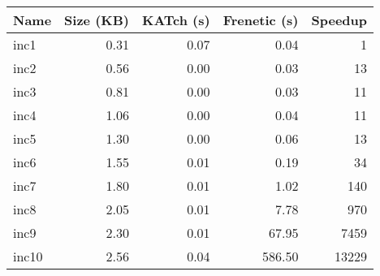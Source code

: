 \begin{tabular}{lrrrr}
\toprule
Name & Size (KB) & KATch (s) & Frenetic (s) & Speedup \\
\midrule
inc1 & 0.31 & 0.07 & 0.04 & 1 \\
inc2 & 0.56 & 0.00 & 0.03 & 13 \\
inc3 & 0.81 & 0.00 & 0.03 & 11 \\
inc4 & 1.06 & 0.00 & 0.04 & 11 \\
inc5 & 1.30 & 0.00 & 0.06 & 13 \\
inc6 & 1.55 & 0.01 & 0.19 & 34 \\
inc7 & 1.80 & 0.01 & 1.02 & 140 \\
inc8 & 2.05 & 0.01 & 7.78 & 970 \\
inc9 & 2.30 & 0.01 & 67.95 & 7459 \\
inc10 & 2.56 & 0.04 & 586.50 & 13229 \\
\bottomrule
\end{tabular}
